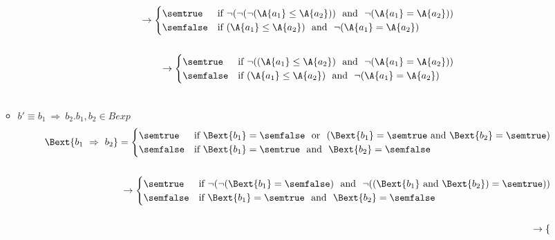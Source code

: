 \begin{enumerate}[label=(\alph*)]
\begin{itemize}
\begin{align*}
      \rightarrow
      \begin{cases} 
      \semtrue & 
      \mbox{if} \ \lnot ( \lnot ( \lnot (\A{a_1} \leq \A{a_2}))  \ \mbox{ and } \ \lnot (\A{a_1} = \A{a_2}))\\ 
      \semfalse & 
      \mbox{if} \  (\A{a_1} \leq \A{a_2})  \ \mbox{ and } \ \lnot (\A{a_1} = \A{a_2})\\
      \end{cases} \\ \\ 
      \rightarrow
      \begin{cases} 
      \semtrue & 
      \mbox{if} \ \lnot ( (\A{a_1} \leq \A{a_2})  \ \mbox{ and } \ \lnot (\A{a_1} = \A{a_2}))\\ 
      \semfalse & 
      \mbox{if} \  (\A{a_1} \leq \A{a_2})  \ \mbox{ and } \ \lnot (\A{a_1} = \A{a_2})\\
      \end{cases} \\ \\ 
    \end{align*} 
    \item $ b' \equiv b_1 \ \Rightarrow \ b_2. b_1, b_2 \in Bexp $ \\
    \begin{align*}
      \Bext{b_1 \ \Rightarrow \ b_2} = 
      \begin{cases} 
      \semtrue & 
      \mbox{if} \ \Bext{b_1} = \semfalse \ \mbox{ or } \
                (\Bext{b_1} = \semtrue \ \mbox{and} \ \Bext{b_2} = \semtrue)\\ 
      \semfalse & 
      \mbox{if} \ \Bext{b_1} = \semtrue \ \mbox{ and } \ 
                \Bext{b_2} = \semfalse \\ 
      \end{cases} \\ \\  
      \rightarrow
      \begin{cases} 
      \semtrue & 
      \mbox{if} \ \lnot ( \lnot (\Bext{b_1} = \semfalse) 
                \ \mbox{ and } \
                \lnot ((\Bext{b_1} \ \mbox{and} \ \Bext{b_2}) = \semtrue))\\ 
      \semfalse & 
      \mbox{if} \ \Bext{b_1} = \semtrue \ \mbox{ and } \ 
                \Bext{b_2} = \semfalse \\ 
      \end{cases}  \\ \\ 
      \rightarrow
      \begin{cases} 

\end{cases}
\end{align*}
\end{itemize}
\end{enumerate}
